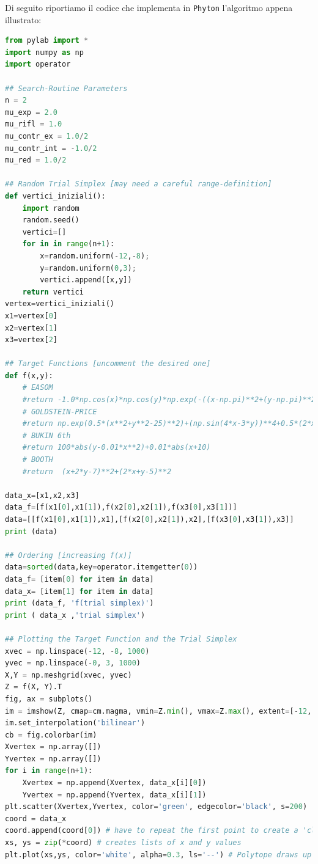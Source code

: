 \vfill

\newpage

\noindent Di seguito riportiamo il codice che implementa in \texttt{Phyton} l'algoritmo appena illustrato:

\begin{lstlisting}[language=python, style=Pystyle, caption=\texttt{Python} code for Simplex Minimization Routine, label=list:Simplex, 	captionpos=b]
from pylab import *
import numpy as np
import operator

## Search-Routine Parameters
n = 2 
mu_exp = 2.0
mu_rifl = 1.0
mu_contr_ex = 1.0/2
mu_contr_int = -1.0/2
mu_red = 1.0/2

## Random Trial Simplex [may need a careful range-definition]
def vertici_iniziali():
	import random 
	random.seed()
	vertici=[]
	for in in range(n+1):
		x=random.uniform(-12,-8);
		y=random.uniform(0,3);
		vertici.append([x,y])
	return vertici 
vertex=vertici_iniziali() 
x1=vertex[0]
x2=vertex[1]
x3=vertex[2]

## Target Functions [uncomment the desired one]
def f(x,y):
	# EASOM
	#return -1.0*np.cos(x)*np.cos(y)*np.exp(-((x-np.pi)**2+(y-np.pi)**2))         
	# GOLDSTEIN-PRICE
	#return np.exp(0.5*(x**2+y**2-25)**2)+(np.sin(4*x-3*y))**4+0.5*(2*x+y-10)**2
	# BUKIN 6th   
	#return 100*abs(y-0.01*x**2)+0.01*abs(x+10)
	# BOOTH                                   
	#return  (x+2*y-7)**2+(2*x+y-5)**2
	                           
data_x=[x1,x2,x3]
data_f=[f(x1[0],x1[1]),f(x2[0],x2[1]),f(x3[0],x3[1])]
data=[[f(x1[0],x1[1]),x1],[f(x2[0],x2[1]),x2],[f(x3[0],x3[1]),x3]]
print (data)

## Ordering [increasing f(x)]
data=sorted(data,key=operator.itemgetter(0)) 
data_f= [item[0] for item in data]
data_x= [item[1] for item in data]
print (data_f, 'f(trial simplex)')
print ( data_x ,'trial simplex')

## Plotting the Target Function and the Trial Simplex
xvec = np.linspace(-12, -8, 1000)
yvec = np.linspace(-0, 3, 1000)
X,Y = np.meshgrid(xvec, yvec)
Z = f(X, Y).T
fig, ax = subplots()
im = imshow(Z, cmap=cm.magma, vmin=Z.min(), vmax=Z.max(), extent=[-12, -8, 0, 3])
im.set_interpolation('bilinear')
cb = fig.colorbar(im)
Xvertex = np.array([])
Yvertex = np.array([])
for i in range(n+1):
	Xvertex = np.append(Xvertex, data_x[i][0])
	Yvertex = np.append(Yvertex, data_x[i][1])
plt.scatter(Xvertex,Yvertex, color='green', edgecolor='black', s=200)
coord = data_x
coord.append(coord[0]) # have to repeat the first point to create a 'closed loop'
xs, ys = zip(*coord) # creates lists of x and y values
plt.plot(xs,ys, color='white', alpha=0.3, ls='--') # Polytope draws up 


\end{lstlisting}
